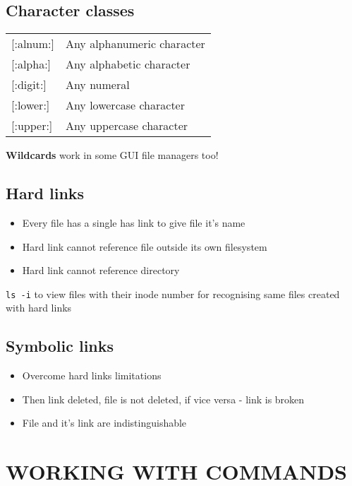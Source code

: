 \documentclass[8pt]{extarticle}
\begin{document}
\begin{multicols}{2}
\subsection{Character classes}
\begin{tabular}{ll}
{[:alnum:]}& Any alphanumeric character\\
{[:alpha:]} & Any alphabetic character\\
{[:digit:]} & Any numeral\\
{[:lower:]} & Any lowercase character\\
{[:upper:]} & Any uppercase character\\
\end{tabular}

\textbf{Wildcards} work in some GUI file managers too!

\subsection{Hard links}
\begin{itemize}
	\item Every file has a single has link to give file it's name
	\item Hard link cannot reference file outside its own filesystem
	\item Hard link cannot reference directory
\end{itemize}

\texttt{ls -i} to view files with their inode number for recognising same files created with hard links

\subsection{Symbolic links}
\begin{itemize}
	\item Overcome hard links limitations
	\item Then link deleted, file is not deleted, if vice versa - link is broken
	\item File and it's link are indistinguishable
\end{itemize}

\section{WORKING WITH COMMANDS}


\end{multicols}
\end{document}
